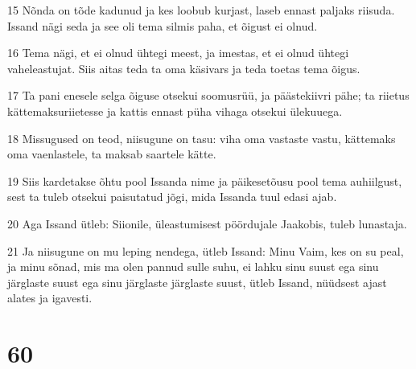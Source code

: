 \par 15 Nõnda on tõde kadunud ja kes loobub kurjast, laseb ennast paljaks riisuda. Issand nägi seda ja see oli tema silmis paha, et õigust ei olnud.
\par 16 Tema nägi, et ei olnud ühtegi meest, ja imestas, et ei olnud ühtegi vaheleastujat. Siis aitas teda ta oma käsivars ja teda toetas tema õigus.
\par 17 Ta pani enesele selga õiguse otsekui soomusrüü, ja päästekiivri pähe; ta riietus kättemaksuriietesse ja kattis ennast püha vihaga otsekui ülekuuega.
\par 18 Missugused on teod, niisugune on tasu: viha oma vastaste vastu, kättemaks oma vaenlastele, ta maksab saartele kätte.
\par 19 Siis kardetakse õhtu pool Issanda nime ja päikesetõusu pool tema auhiilgust, sest ta tuleb otsekui paisutatud jõgi, mida Issanda tuul edasi ajab.
\par 20 Aga Issand ütleb: Siionile, üleastumisest pöördujale Jaakobis, tuleb lunastaja.
\par 21 Ja niisugune on mu leping nendega, ütleb Issand: Minu Vaim, kes on su peal, ja minu sõnad, mis ma olen pannud sulle suhu, ei lahku sinu suust ega sinu järglaste suust ega sinu järglaste järglaste suust, ütleb Issand, nüüdsest ajast alates ja igavesti.

\chapter{60}

